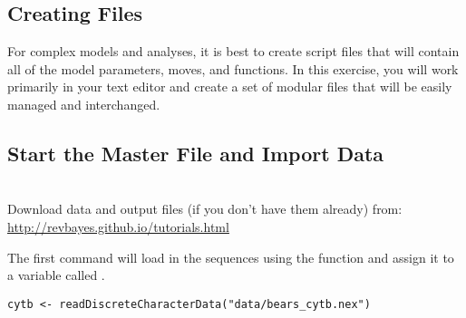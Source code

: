 \bigskip

\subsection{Creating \Rev Files}

For complex models and analyses, it is best to create \Rev script files that will contain all of the model parameters, moves, and functions. 
In this exercise, you will work primarily in your text editor and create a set of modular files that will be easily managed and interchanged.

\bigskip
\subsection{Start the Master \Rev File and Import Data}


\noindent \\ \impmark Download data and output files (if you don't have them already) from: \\ \href{http://revbayes.github.io/tutorials.html}{http://revbayes.github.io/tutorials.html}

%


The first command will load in the sequences using the  function and assign it to a variable called . 

{\tt \begin{snugshade*}
\begin{lstlisting}
cytb <- readDiscreteCharacterData("data/bears_cytb.nex") 
\end{lstlisting}
\end{snugshade*}}

